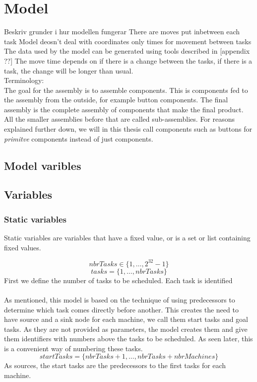 \documentclass[10pt,a4paper]{report}
\begin{document}
\section{Model}
Beskriv grunder i hur modellen fungerar
There are moves put inbetween each task
Model deosn't deal with coordinates only times for movement between tasks
The data used by the model can be generated using tools described in [appendix ??]
The move time depends on if there is a change between the tasks, if there is a task, the change will be longer than usual.
\\Terminology:\\
The goal for the assembly is to assemble components. This is components fed to the assembly from the outside, for example button components. The final assembly is the complete assembly of components that make the final product. All the smaller assemblies before that are called sub-assemblies. For reasons explained further down, we will in this thesis call components such as buttons for \emph{primitve} components instead of just components.
\subsection{Model varibles}
\subsection{Variables}
\subsubsection{Static variables}
Static variables are variables that have a fixed value, or is a set or list containing fixed values.

\begin{equation}\label{eq:1}
nbrTasks \in \{1 , \ldots , 2^{32}-1\}
\end{equation}
\begin{equation}\label{eq:10}
tasks = \{1 , \ldots , nbrTasks\}
\end{equation}
First we define the number of tasks to be scheduled. Each task is identified 
\\\\
As mentioned, this model is based on the technique of using predecessors to determine which task comes directly before another. This creates the need to have source and a sink node for each machine, we call them start tasks and goal tasks. As they are not provided as parameters, the model creates them and give them identifiers with numbers above the tasks to be scheduled. As seen later, this is a convenient way of numbering these tasks.
\begin{equation}\label{eq:19}
startTasks = \{nbrTasks+1 , \ldots , nbrTasks+nbrMachines\}
\end{equation}
As sources, the start tasks are the predecessors to the first tasks for each machine.
\end{document}
